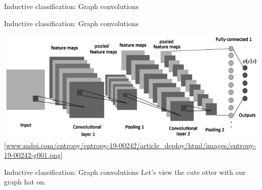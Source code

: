 \documentclass{beamer}
\begin{document}
\begin{frame}{Inductive classification: Graph convolutions}
  \begin{center}
  \end{center}
\end{frame}

\begin{frame}{Inductive classification: Graph convolutions}
  \begin{center}
    \includegraphics[scale=0.45]{gfx/cnn.png}
    {\tiny [\url{www.mdpi.com/entropy/entropy-19-00242/article_deploy/html/images/entropy-19-00242-g001.png}]}
  \end{center}
\end{frame}

\begin{frame}{Inductive classification: Graph convolutions}
  Let's view the cute otter with our graph hat on.
\end{frame}
\end{document}
